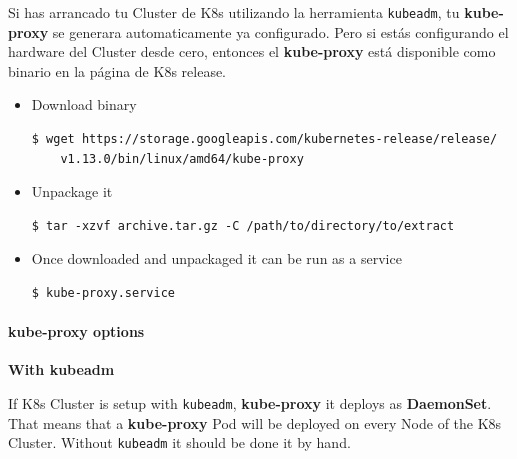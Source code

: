 \documentclass{article}
\newenvironment{blocktemplateI}[1]{%
    \tcolorbox[beamer,%
    noparskip,breakable,
    colframe=Violet,%
    colbacklower=Black,%
    title=#1]}%
    {\endtcolorbox}
\newenvironment{codetemplate}[1][]{%
  \mybasecolorbox[#1]
  \itshape
}{%
  \endmybasecolorbox
}
\begin{document}
Si has arrancado tu Cluster de K8s utilizando la herramienta \verb|kubeadm|, tu \textbf{kube-proxy} se generara automaticamente ya configurado. Pero si estás configurando el hardware del Cluster desde cero, entonces el \textbf{kube-proxy} está disponible como binario en la página de K8s release.

\begin{itemize}
    \item Download binary
\begin{codetemplate}{}
\begin{verbatim}
$ wget https://storage.googleapis.com/kubernetes-release/release/
    v1.13.0/bin/linux/amd64/kube-proxy
\end{verbatim}
\end{codetemplate}

    \item Unpackage it
\begin{codetemplate}{}
\begin{verbatim}
$ tar -xzvf archive.tar.gz -C /path/to/directory/to/extract
\end{verbatim}
\end{codetemplate} 

    \item Once downloaded and unpackaged it can be run as a service
\begin{codetemplate}{}
\begin{verbatim}
$ kube-proxy.service
\end{verbatim}
\end{codetemplate}
\end{itemize}

\paragraph{kube-proxy options}

\textbf{With kubeadm}

\begin{blocktemplateI} {Note}
If K8s Cluster is setup with \verb|kubeadm|, \textbf{kube-proxy} it deploys as \textbf{DaemonSet}. That means that a \textbf{kube-proxy} Pod will be deployed on every Node of the K8s Cluster. Without \verb|kubeadm| it should be done it by hand.
\end{blocktemplateI}
\end{document}
